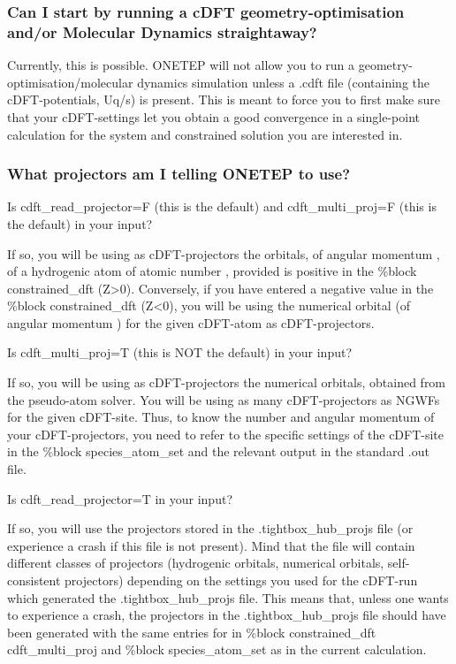 \documentclass[letterpaper,10pt,english]{sphinxmanual}
\begin{document}
\subsubsection{Can I start by running a cDFT geometry-optimisation and/or Molecular Dynamics straightaway?}
\label{\detokenize{cDFT:can-i-start-by-running-a-cdft-geometry-optimisation-and-or-molecular-dynamics-straightaway}}
Currently, this is  possible. ONETEP will not allow you to run a
geometry-optimisation/molecular dynamics simulation unless a .cdft file
(containing the cDFT-potentials, Uq/s) is present. This is meant to
force you to first make sure that your cDFT-settings let you obtain a
good convergence in a single-point calculation for the system and
constrained solution you are interested in.


\subsubsection{What projectors am I telling ONETEP to use?}
\label{\detokenize{cDFT:what-projectors-am-i-telling-onetep-to-use}}
Is cdft\_read\_projector=F (this is the default) and cdft\_multi\_proj=F
(this is the default) in your input?

If so, you will be using as cDFT-projectors the orbitals, of angular
momentum , of a hydrogenic atom of atomic number
, provided  is positive in the \%block
constrained\_dft (Z\textgreater{}0). Conversely, if you have entered a negative
 value in the \%block constrained\_dft (Z\textless{}0), you will be
using the numerical orbital (of angular momentum ) for the
given cDFT-atom as cDFT-projectors.

Is cdft\_multi\_proj=T (this is NOT the default) in your input?

If so, you will be using as cDFT-projectors the numerical orbitals,
obtained from the pseudo-atom solver. You will be using as many
cDFT-projectors as NGWFs for the given cDFT-site. Thus, to know the
number and angular momentum of your cDFT-projectors, you need to refer
to the specific settings of the cDFT-site in the \%block
species\_atom\_set and the relevant output in the standard .out file.

Is cdft\_read\_projector=T in your input?

If so, you will use the projectors stored in the .tightbox\_hub\_projs
file (or experience a crash if this file is not present). Mind that the
file will contain different classes of projectors (hydrogenic orbitals,
numerical orbitals, self-consistent projectors) depending on the
settings you used for the cDFT-run which generated the
.tightbox\_hub\_projs file. This means that, unless one wants to
experience a crash, the projectors in the .tightbox\_hub\_projs file
should have been generated with the same entries for   in \%block constrained\_dft  cdft\_multi\_proj and
\%block species\_atom\_set as in the current calculation.
\end{document}
